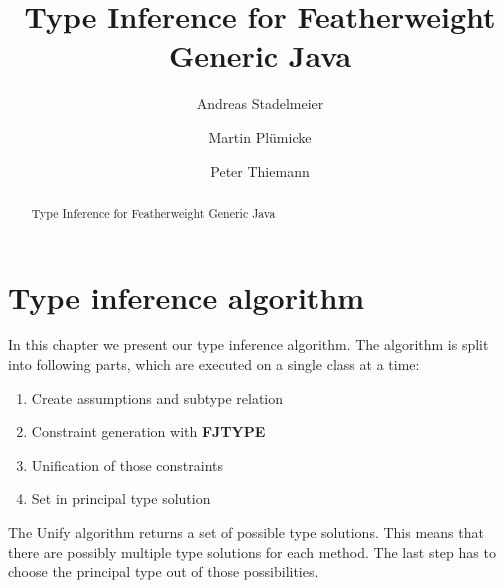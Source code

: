 \documentclass[runningheads]{llncs}
\begin{document}
\title{Type Inference for Featherweight Generic Java}


\author{Andreas Stadelmeier \and
Martin Plümicke\and
Peter Thiemann}
%
%


\maketitle

\begin{abstract}
  Type Inference for Featherweight Generic Java
\end{abstract}









\section{Type inference algorithm}
\label{sec:type-infer-algor}
In this chapter we present our type inference algorithm.
The algorithm is split into following parts, which are executed on a single class at a time:

\begin{enumerate}
\item Create assumptions and subtype relation
\item Constraint generation with \textbf{FJTYPE}
\item Unification of those constraints
\item Set in principal type solution
\end{enumerate}

The Unify algorithm returns a set of possible type solutions.
This means that there are possibly multiple type solutions for each method.
The last step has to choose the principal type out of those possibilities.
\end{document}
